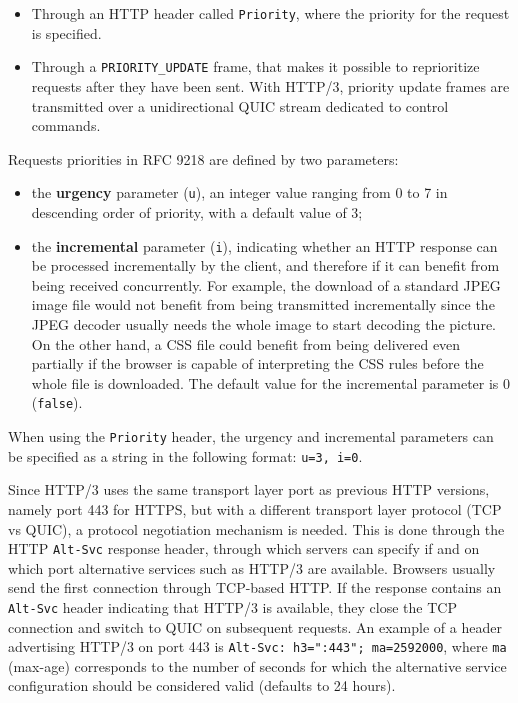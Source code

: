 \begin{itemize}
    \item Through an HTTP header called \texttt{Priority}, where the priority for the request is specified.
    \item Through a \texttt{PRIORITY\_UPDATE} frame, that makes it possible to reprioritize requests after they have been sent. With HTTP/3, priority update frames are transmitted over a unidirectional QUIC stream dedicated to control commands.
\end{itemize}

Requests priorities in RFC 9218 are defined by two parameters:

\begin{itemize}
    \item the \textbf{urgency} parameter (\texttt{u}), an integer value ranging from 0 to 7 in descending order of priority, with a default value of 3;
    \item the \textbf{incremental} parameter (\texttt{i}), indicating whether an HTTP response can be processed incrementally by the client, and therefore if it can benefit from being received concurrently. For example, the download of a standard JPEG image file would not benefit from being transmitted incrementally since the JPEG decoder usually needs the whole image to start decoding the picture. On the other hand, a CSS file could benefit from being delivered even partially if the browser is capable of interpreting the CSS rules before the whole file is downloaded. The default value for the incremental parameter is 0 (\texttt{false}).
\end{itemize}

When using the \texttt{Priority} header, the urgency and incremental parameters can be specified as a string in the following format: \texttt{u=3, i=0}.

Since HTTP/3 uses the same transport layer port as previous HTTP versions, namely port 443 for HTTPS, but with a different transport layer protocol (TCP vs QUIC), a protocol negotiation mechanism is needed. This is done through the HTTP \texttt{Alt-Svc} response header, through which servers can specify if and on which port alternative services such as HTTP/3 are available. Browsers usually send the first connection through TCP-based HTTP. If the response contains an \texttt{Alt-Svc} header indicating that HTTP/3 is available, they close the TCP connection and switch to QUIC on subsequent requests. An example of a header advertising HTTP/3 on port 443 is \verb|Alt-Svc: h3=":443"; ma=2592000|, where \texttt{ma} (max-age) corresponds to the number of seconds for which the alternative service configuration should be considered valid (defaults to 24 hours).

